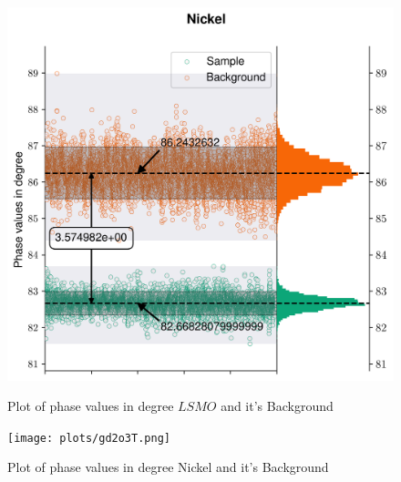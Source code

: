 \begin{figure}[hbt!]
  \includegraphics[width= \linewidth]{plots/nickelT.png}
  \label{Tdata3}
  \caption{Plot of phase values in degree $LSMO$ and it's Background}
\end{figure}
\begin{figure}[hbt!]
  \texttt{[image: plots/gd2o3T.png]}
  \label{Tdata4}
  \caption{Plot of phase values in degree Nickel and it's Background}
\end{figure}
